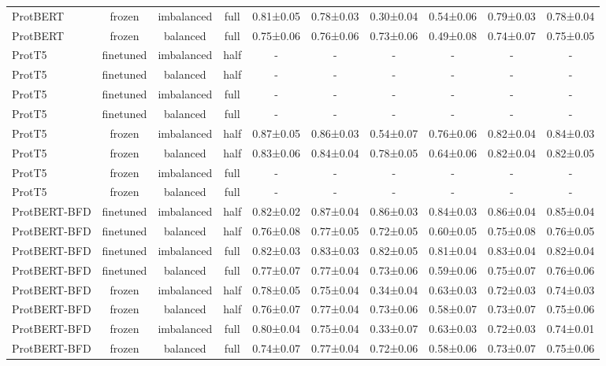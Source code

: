 \begin{tabular}{lccccccccc}
    ProtBERT &         frozen & imbalanced &      full & 0.81±0.05 & 0.78±0.03 & 0.30±0.04 & 0.54±0.06 & 0.79±0.03 & 0.78±0.04 \\
    ProtBERT &         frozen &   balanced &      full & 0.75±0.06 & 0.76±0.06 & 0.73±0.06 & 0.49±0.08 & 0.74±0.07 & 0.75±0.05 \\
      ProtT5 &      finetuned & imbalanced &      half &         - &         - &         - &         - &         - &         - \\
      ProtT5 &      finetuned &   balanced &      half &         - &         - &         - &         - &         - &         - \\
      ProtT5 &      finetuned & imbalanced &      full &         - &         - &         - &         - &         - &         - \\
      ProtT5 &      finetuned &   balanced &      full &         - &         - &         - &         - &         - &         - \\
      ProtT5 &         frozen & imbalanced &      half & 0.87±0.05 & 0.86±0.03 & 0.54±0.07 & 0.76±0.06 & 0.82±0.04 & 0.84±0.03 \\
      ProtT5 &         frozen &   balanced &      half & 0.83±0.06 & 0.84±0.04 & 0.78±0.05 & 0.64±0.06 & 0.82±0.04 & 0.82±0.05 \\
      ProtT5 &         frozen & imbalanced &      full &         - &         - &         - &         - &         - &         - \\
      ProtT5 &         frozen &   balanced &      full &         - &         - &         - &         - &         - &         - \\
ProtBERT-BFD &      finetuned & imbalanced &      half & 0.82±0.02 & 0.87±0.04 & 0.86±0.03 & 0.84±0.03 & 0.86±0.04 & 0.85±0.04 \\
ProtBERT-BFD &      finetuned &   balanced &      half & 0.76±0.08 & 0.77±0.05 & 0.72±0.05 & 0.60±0.05 & 0.75±0.08 & 0.76±0.05 \\
ProtBERT-BFD &      finetuned & imbalanced &      full & 0.82±0.03 & 0.83±0.03 & 0.82±0.05 & 0.81±0.04 & 0.83±0.04 & 0.82±0.04 \\
ProtBERT-BFD &      finetuned &   balanced &      full & 0.77±0.07 & 0.77±0.04 & 0.73±0.06 & 0.59±0.06 & 0.75±0.07 & 0.76±0.06 \\
ProtBERT-BFD &         frozen & imbalanced &      half & 0.78±0.05 & 0.75±0.04 & 0.34±0.04 & 0.63±0.03 & 0.72±0.03 & 0.74±0.03 \\
ProtBERT-BFD &         frozen &   balanced &      half & 0.76±0.07 & 0.77±0.04 & 0.73±0.06 & 0.58±0.07 & 0.73±0.07 & 0.75±0.06 \\
ProtBERT-BFD &         frozen & imbalanced &      full & 0.80±0.04 & 0.75±0.04 & 0.33±0.07 & 0.63±0.03 & 0.72±0.03 & 0.74±0.01 \\
ProtBERT-BFD &         frozen &   balanced &      full & 0.74±0.07 & 0.77±0.04 & 0.72±0.06 & 0.58±0.06 & 0.73±0.07 & 0.75±0.06 \\
\bottomrule
\end{tabular}
